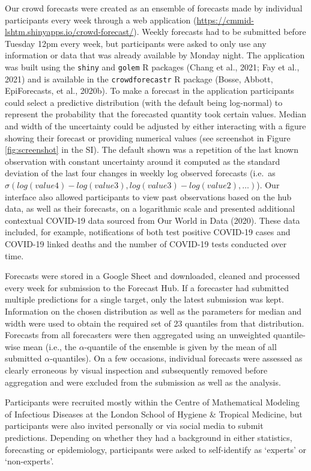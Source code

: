 \documentclass[
]{article}
\begin{document}
Our crowd forecasts were created as an ensemble of forecasts made by individual participants every week through a web application (\url{https://cmmid-lshtm.shinyapps.io/crowd-forecast/}). Weekly forecasts had to be submitted before Tuesday 12pm every week, but participants were asked to only use any information or data that was already available by Monday night. The application was built using the \texttt{shiny} and \texttt{golem} R packages (Chang et al., 2021; Fay et al., 2021) and is available in the \texttt{crowdforecastr} R package (Bosse, Abbott, EpiForecasts, et al., 2020b). To make a forecast in the application participants could select a predictive distribution (with the default being log-normal) to represent the probability that the forecasted quantity took certain values. Median and width of the uncertainty could be adjusted by either interacting with a figure showing their forecast or providing numerical values (see screenshot in Figure \ref{fig:screenshot} in the SI). The default shown was a repetition of the last known observation with constant uncertainty around it computed as the standard deviation of the last four changes in weekly log observed forecasts (i.e.~as \(\sigma(log(value4) - log(value3), log(value3) - log(value2), \ldots )\)).
Our interface also allowed participants to view past observations based on the hub data, as well as their forecasts, on a logarithmic scale and presented additional contextual COVID-19 data sourced from Our World in Data (2020). These data included, for example, notifications of both test positive COVID-19 cases and COVID-19 linked deaths and the number of COVID-19 tests conducted over time.

Forecasts were stored in a Google Sheet and downloaded, cleaned and processed every week for submission to the Forecast Hub. If a forecaster had submitted multiple predictions for a single target, only the latest submission was kept. Information on the chosen distribution as well as the parameters for median and width were used to obtain the required set of 23 quantiles from that distribution. Forecasts from all forecasters were then aggregated using an unweighted quantile-wise mean (i.e., the \(\alpha\)-quantile of the ensemble is given by the mean of all submitted \(\alpha\)-quantiles). On a few occasions, individual forecasts were assessed as clearly erroneous by visual inspection and subsequently removed before aggregation and were excluded from the submission as well as the analysis.

Participants were recruited mostly within the Centre of Mathematical Modeling of Infectious Diseases at the London School of Hygiene \& Tropical Medicine, but participants were also invited personally or via social media to submit predictions. Depending on whether they had a background in either statistics, forecasting or epidemiology, participants were asked to self-identify as `experts' or `non-experts'.
\end{document}
